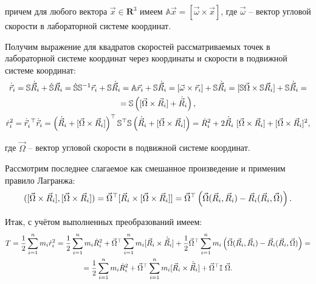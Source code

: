 \documentclass[12pt]{article}
\begin{document}
\hspace*{-0.75cm} причем для любого вектора $\vec{x} \in \mathbf{R}^3$ имеем $\mathbb{A} \vec{x} = [ \vec{\omega} \times \vec{x} ]$, где $\vec{\omega}$ -- вектор угловой скорости в лабораторной системе координат.

Получим выражение для квадратов скоростей рассматриваемых точек в лабораторной системе координат через координаты и скорости в подвижной системе координат:
\vspace*{-0.1cm}
\begin{gather}
\dot{\vec{r}}_i = \mathbb{S} \dot{\vec{R}}_i + \dot{\mathbb{S}} \vec{R}_i = \dot{\mathbb{S}} \mathbb{S}^{-1} \vec{r}_i + \mathbb{S} \dot{\vec{R}}_i  = \mathbb{A} \vec{r}_i + \mathbb{S} \dot{\vec{R}}_i = [ \vec{\omega} \times \vec{r}_i ] + \mathbb{S} \dot{\vec{R}}_i = [\mathbb{S} \vec{\Omega} \times \mathbb{S} \vec{R}_i ] + \mathbb{S} \dot{\vec{R}}_i = \notag \\
= \mathbb{S} \left( [\vec{\Omega} \times \vec{R}_i ] + \dot{\vec{R}}_i \right)  \notag , \\
\dot{r}_i^2 = \dot{\vec{r}}_i^{\ \top} \dot{\vec{r}}_i = \left( \dot{\vec{R}}_i + [ \vec{\Omega} \times \vec{R}_i] \right)^\top \mathbb{S}^\top \mathbb{S} \left( \dot{\vec{R}}_i + [ \vec{\Omega} \times \vec{R}_i ] \right) = \dot{R}_i^2 + 2 \dot{\vec{R}}_i \ [ \vec{\Omega} \times \vec{R}_i] + [ \vec{\Omega} \times \vec{R}_i ]^2 \notag ,
\end{gather}

\hspace*{-0.75cm} где $\vec{\Omega}$ -- вектор угловой скорости в подвижной системе координат.

Рассмотрим последнее слагаемое как смешанное произведение и применим правило Лагранжа:
\vspace*{-0.1cm}
\begin{gather}
([\vec{\Omega} \times \vec{R}_i] , [\vec{\Omega} \times \vec{R}_i]) = \vec{\Omega}^\top [ \vec{R}_i \times [ \vec{\Omega} \times \vec{R}_i ]] = \vec{\Omega}^\top \left( \vec{\Omega} (\vec{R}_i, \vec{R}_i ) - \vec{R}_i (\vec{R}_i, \vec{\Omega} ) \right)
\notag .
\end{gather}

Итак, с учётом выполненных преобразований имеем:
\vspace*{-0.1cm}
\begin{gather}
T = \frac{1}{2} \sum_{i=1}^{n} m_i \dot{r}_i^2 = \frac{1}{2} \sum_{i=1}^{n} m_i \dot{R}_i^2 + \vec{\Omega} ^\top \sum_{i=1}^{n} m_i[ \vec{R}_i \times \dot{\vec{R}}_i ] + \frac{1}{2} \vec{\Omega}^\top \sum_{i=1}^{n} m_i \left( \vec{\Omega} (\vec{R}_i, \vec{R}_i ) - \vec{R}_i (\vec{R}_i, \vec{\Omega} ) \right) = 
\notag \\
= \frac{1}{2} \sum_{i=1}^{n} m_i \dot{R}_i^2 + \vec{\Omega}^\top \sum_{i=1}^{n} m_i [ \vec{R}_i \times \dot{\vec{R}}_i ] + \vec{\Omega}^\top \mathbb{I} \ \vec{\Omega} \notag .
\end{gather}
\end{document}
